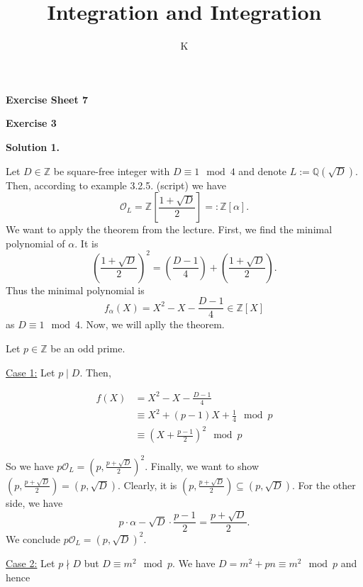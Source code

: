 \documentclass[a4paper]{article}
\title{Integration and Integration}
\author{K}
\theoremstyle{definition}
\begin{document}
\begin{center}
    \noindent\textbf{Exercise Sheet 7}
\end{center}
\noindent\textbf{Exercise 3}

\noindent\textbf{Solution 1.}

\noindent Let \(D \in \mathbb{Z}\) be square-free integer with \(D \equiv 1 \mod{4}\) and denote \(L := \mathbb{Q}(\sqrt{D})\). Then, according to example 3.2.5. (script) we have 
\begin{equation}
    \mathcal{O}_L = \mathbb{Z}\left[\frac{1 + \sqrt{D}}{2}\right] =: \mathbb{Z}[\alpha] \text{.}
\end{equation}
We want to apply the theorem from the lecture. First, we find the minimal polynomial of \(\alpha\). It is
\begin{equation}
    \left(\frac{1 + \sqrt{D}}{2}\right)^2 = \left(\frac{D - 1}{4}\right) + \left(\frac{1 + \sqrt{D}}{2}\right)\text{.}
\end{equation}
Thus the minimal polynomial is
\begin{equation}
    f_\alpha(X) = X^2 - X - \frac{D - 1}{4} \in \mathbb{Z}[X]
\end{equation}
as \(D \equiv 1 \mod{4}\). Now, we will aplly the theorem.

\bigskip

\noindent Let \(p \in \mathbb{Z}\) be an odd prime.

\noindent \underline{Case 1:} Let \(p \mid D\). Then,

\begin{align}
    f(X) &= X^2 - X - \frac{D - 1}{4}\\
    &\equiv X^2 + (p - 1)X + \frac{1}{4} \mod{p} \\
    &\equiv \left(X + \frac{p-1}{2}\right)^2 \mod{p}
\end{align}

\noindent So we have \(p\mathcal{O}_L = (p, \frac{p +\sqrt{D}}{2})^2\). Finally, we want to show \((p, \frac{p + \sqrt{D}}{2}) = (p, \sqrt{D})\). Clearly, it is \((p, \frac{p + \sqrt{D}}{2}) \subseteq (p, \sqrt{D})\). For the other side, we have
\begin{equation}
    p \cdot \alpha - \sqrt{D} \cdot \frac{p - 1}{2} = \frac{p + \sqrt{D}}{2} \text{.}
\end{equation}
We conclude \(p \mathcal{O}_L = (p, \sqrt{D})^2\).

\bigskip

\noindent \underline{Case 2:} Let \(p \nmid D\) but \(D \equiv m^2 \mod{p}\). We have \(D = m^2 + pn \equiv m^2 \mod{p}\) and hence 
\end{document}
